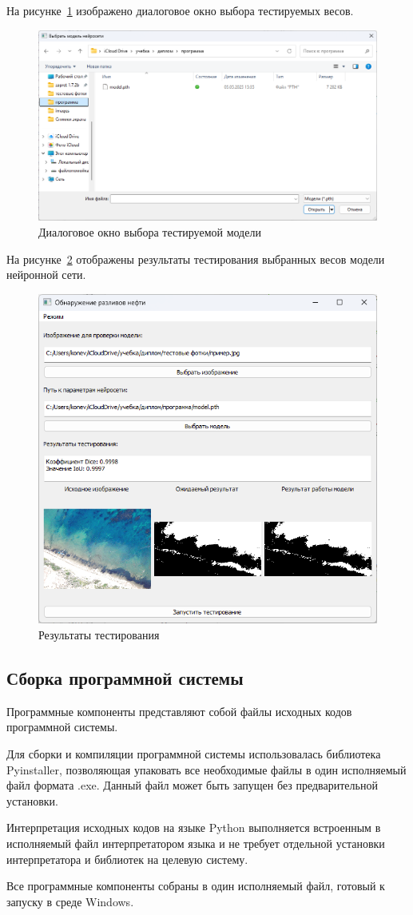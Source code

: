 На рисунке~\ref{fig:test_model_select} изображено диалоговое окно выбора тестируемых весов.
\begin{figure}[H]
	\centering
	\includegraphics[width=0.7\linewidth]{"images/выбор тестовой модели"}
	\caption{Диалоговое окно выбора тестируемой модели}
	\label{fig:test_model_select}
\end{figure}

На рисунке~\ref{fig:test_results_show} отображены результаты тестирования выбранных весов модели нейронной сети.
\begin{figure}[H]
	\centering
	\includegraphics[width=0.7\linewidth]{"images/результаты теста"}
	\caption{Результаты тестирования}
	\label{fig:test_results_show}
\end{figure}

\subsection{Сборка программной системы}

Программные компоненты представляют собой файлы исходных кодов программной системы.

Для сборки и компиляции программной системы использовалась библиотека Pyinstaller, позволяющая упаковать все необходимые файлы в один исполняемый файл формата .exe. Данный файл может быть запущен без предварительной установки.

Интерпретация исходных кодов на языке Python выполняется встроенным в исполняемый файл интерпретатором языка и не требует отдельной установки интерпретатора и библиотек на целевую систему.

Все программные компоненты собраны в один исполняемый файл, готовый к запуску в среде Windows.